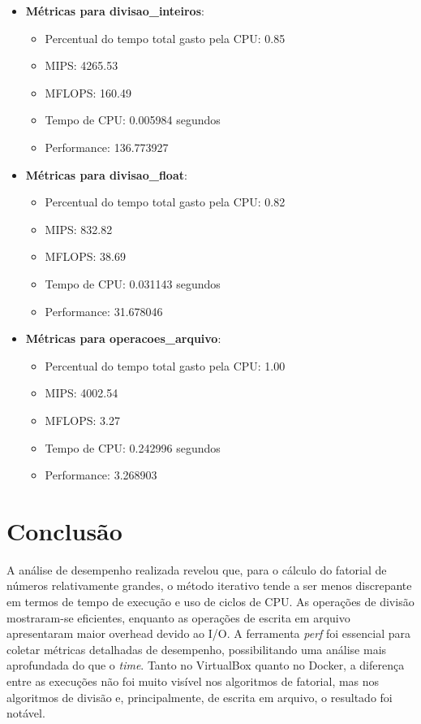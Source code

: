 \documentclass[12pt]{article}
\begin{document}
\begin{itemize}
    \item \textbf{Métricas para divisao\_inteiros}:
    \begin{itemize}
        \item Percentual do tempo total gasto pela CPU: 0.85
        \item MIPS: 4265.53
        \item MFLOPS: 160.49
        \item Tempo de CPU: 0.005984 segundos
        \item Performance: 136.773927
    \end{itemize}

    \item \textbf{Métricas para divisao\_float}:
    \begin{itemize}
        \item Percentual do tempo total gasto pela CPU: 0.82
        \item MIPS: 832.82
        \item MFLOPS: 38.69
        \item Tempo de CPU: 0.031143 segundos
        \item Performance: 31.678046
    \end{itemize}

    \item \textbf{Métricas para operacoes\_arquivo}:
    \begin{itemize}
        \item Percentual do tempo total gasto pela CPU: 1.00
        \item MIPS: 4002.54
        \item MFLOPS: 3.27
        \item Tempo de CPU: 0.242996 segundos
        \item Performance: 3.268903
    \end{itemize}
\end{itemize}

\newpage

\section{Conclusão}
A análise de desempenho realizada revelou que, para o cálculo do fatorial de números relativamente grandes, o método iterativo tende a ser menos discrepante em termos de tempo de execução e uso de ciclos de CPU. As operações de divisão mostraram-se eficientes, enquanto as operações de escrita em arquivo apresentaram maior overhead devido ao I/O. A ferramenta \textit{perf} foi essencial para coletar métricas detalhadas de desempenho, possibilitando uma análise mais aprofundada do que o \textit{time}. Tanto no VirtualBox quanto no Docker, a diferença entre as execuções não foi muito visível nos algoritmos de fatorial, mas nos algoritmos de divisão e, principalmente, de escrita em arquivo, o resultado foi notável.
\end{document}
